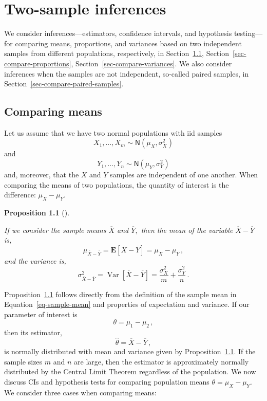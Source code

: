 \documentclass[
  a4paper,
  DIV=11,
  numbers=noendperiod,
  oneside]{scrreprt}
\theoremstyle{definition}
\theoremstyle{definition}
\theoremstyle{plain}
\newtheorem{proposition}{Proposition}[chapter]
\theoremstyle{plain}
\theoremstyle{definition}
\theoremstyle{remark}
\begin{document}
\chapter{Two-sample inferences}\label{sec-inference-two-samples}

We consider inferences---estimators, confidence intervals, and
hypothesis testing---for comparing means, proportions, and variances
based on two independent samples from different populations,
respectively, in Section~\ref{sec-compare-means},
Section~\ref{sec-compare-proportions},
Section~\ref{sec-compare-variances}. We also consider inferences when
the samples are not independent, so-called paired samples, in
Section~\ref{sec-compare-paired-samples}.

\section{Comparing means}\label{sec-compare-means}

Let us assume that we have two normal populations with iid samples \[
 X_1, \dots, X_m \sim \mathsf{N}(\mu_X, \sigma_X^2)
\] and \[
 Y_1, \dots, Y_n \sim \mathsf{N}(\mu_Y, \sigma_Y^2)
\] and, moreover, that the \(X\) and \(Y\) samples are independent of
one another. When comparing the means of two populations, the quantity
of interest is the difference: \(\mu_X - \mu_Y.\)

\begin{proposition}[]\protect\hypertarget{prp-qoi-diff-pop-means}{}\label{prp-qoi-diff-pop-means}

If we consider the sample means \(\overline{X}\) and \(\overline{Y},\)
then the mean of the variable \(\overline{X} - \overline{Y}\) is, \[
 \mu_{\overline{X} - \overline{Y}} 
= \mathbf{E}\left[ \overline{X} - \overline{Y} \right] = \mu_X - \mu_Y\,,
\] and the variance is, \[
 \sigma_{\overline{X} - \overline{Y}}^2
= \mathop{\mathrm{Var}}\left[ \overline{X} - \overline{Y} \right]
= \frac{\sigma_X^2}{m} + \frac{\sigma_Y^2}{n} \,.
\]

\end{proposition}

Proposition~\ref{prp-qoi-diff-pop-means} follows directly from the
definition of the sample mean in Equation~\ref{eq-sample-mean} and
properties of expectation and variance. If our parameter of interest is
\[
 \theta = \mu_1 - \mu_2\,,
\] then its estimator, \[
 \widehat{\theta} = \overline{X} - \overline{Y}\,,
\] is normally distributed with mean and variance given by
Proposition~\ref{prp-qoi-diff-pop-means}. If the sample sizes \(m\) and
\(n\) are large, then the estimator is approximately normally
distributed by the Central Limit Theorem regardless of the population.
We now discuss CIs and hypothesis tests for comparing population means
\(\theta = \mu_X - \mu_Y.\) We consider three cases when comparing
means:
\end{document}
